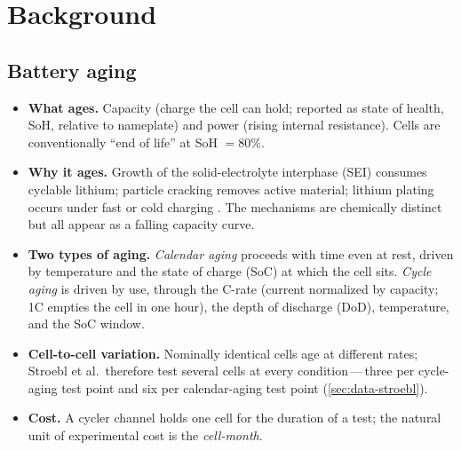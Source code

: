 \documentclass[11pt,letterpaper]{article}
\newcommand{\dash}{\,---\,}
\begin{document}
\section{Background}\label{sec:background}

\subsection{Battery aging}
\begin{itemize}
  \item \textbf{What ages.} Capacity (charge the cell can hold; reported as state of health, SoH, relative to nameplate) and power (rising internal resistance). Cells are conventionally ``end of life'' at SoH $=80\%$.
  \item \textbf{Why it ages.} Growth of the solid-electrolyte interphase (SEI) consumes cyclable lithium; particle cracking removes active material; lithium plating occurs under fast or cold charging \cite{vetter2005}. The mechanisms are chemically distinct but all appear as a falling capacity curve.
  \item \textbf{Two types of aging.} \emph{Calendar aging} proceeds with time even at rest, driven by temperature and the state of charge (SoC) at which the cell sits. \emph{Cycle aging} is driven by use, through the C-rate (current normalized by capacity; 1C empties the cell in one hour), the depth of discharge (DoD), temperature, and the SoC window.
  \item \textbf{Cell-to-cell variation.} Nominally identical cells age at different rates; Stroebl et al.\ therefore test several cells at every condition\dash three per cycle-aging test point and six per calendar-aging test point \cite{stroebl2024} (\cref{sec:data-stroebl}).
  \item \textbf{Cost.} A cycler channel holds one cell for the duration of a test; the natural unit of experimental cost is the \emph{cell-month}.
\end{itemize}
\end{document}
